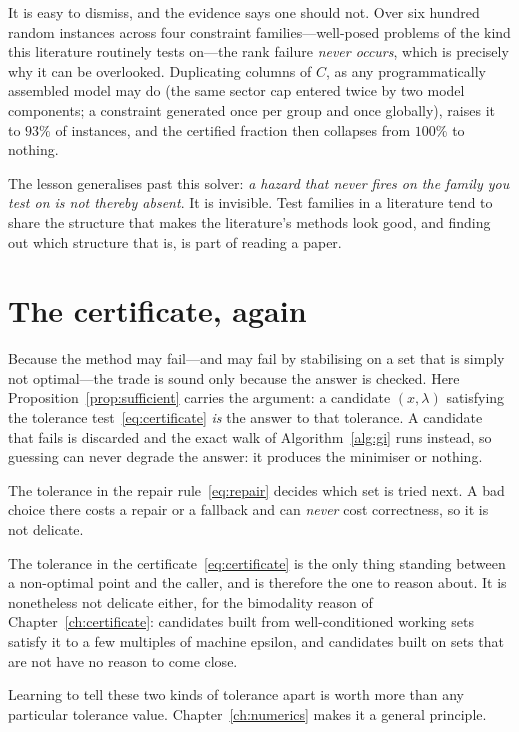\begin{remark}
\label{rem:93}
It is easy to dismiss, and the evidence says one should not. Over six hundred
random instances across four constraint families---well-posed problems of the kind
this literature routinely tests on---the rank failure \emph{never occurs}, which is
precisely why it can be overlooked. Duplicating columns of $C$, as any
programmatically assembled model may do (the same sector cap entered twice by two
model components; a constraint generated once per group and once globally), raises
it to $93\%$ of instances, and the certified fraction then collapses from $100\%$ to
nothing.

The lesson generalises past this solver: \emph{a hazard that never fires on the
family you test on is not thereby absent}. It is invisible. Test families in a
literature tend to share the structure that makes the literature's methods look
good, and finding out which structure that is, is part of reading a paper.
\end{remark}

\section{The certificate, again}

Because the method may fail---and may fail by stabilising on a set that is simply
not optimal---the trade is sound only because the answer is checked. Here
Proposition~\ref{prop:sufficient} carries the argument: a candidate $(x,\lambda)$
satisfying the tolerance test~\eqref{eq:certificate} \emph{is} the answer to that
tolerance. A candidate that fails is discarded and the exact walk of
Algorithm~\ref{alg:gi} runs instead, so guessing can never degrade the answer: it
produces the minimiser or nothing.

\begin{remark}
\label{rem:twotol}
The tolerance in the repair rule~\eqref{eq:repair} decides which set is tried next.
A bad choice there costs a repair or a fallback and can \emph{never} cost
correctness, so it is not delicate.

The tolerance in the certificate~\eqref{eq:certificate} is the only thing standing
between a non-optimal point and the caller, and is therefore the one to reason
about. It is nonetheless not delicate either, for the bimodality reason of
Chapter~\ref{ch:certificate}: candidates built from well-conditioned working sets
satisfy it to a few multiples of machine epsilon, and candidates built on sets that
are not have no reason to come close.

Learning to tell these two kinds of tolerance apart is worth more than any
particular tolerance value. Chapter~\ref{ch:numerics} makes it a general principle.
\end{remark}

